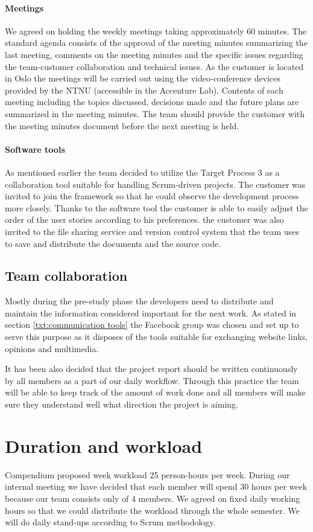 \paragraph{Meetings}
We agreed on holding the weekly meetings taking approximately 60 minutes. The standard agenda consists of the approval of the meeting minutes summarizing the last meeting, comments on the meeting minutes and the specific issues regarding the team-customer collaboration and technical issues. As the customer is located in Oslo the meetings will be carried out using the video-conference devices provided by the NTNU (accessible in the Accenture Lab). Contents of each meeting including the topics discussed, decisions made and the future plans are summarized in the meeting minutes. The team should provide the customer with the meeting minutes document before the next meeting is held.

\paragraph{Software tools}
As mentioned earlier the team decided to utilize the Target Process 3 as a collaboration tool suitable for handling Scrum-driven projects. The customer was invited to join the framework so that he could observe the development process more closely. Thanks to the software tool the customer is able to easily adjust the order of the user stories according to his preferences. the customer was also invited to the file sharing service and version control system that the team uses to save and distribute the documents and the source code.

\subsection{Team collaboration}
Mostly during the pre-study phase the developers need to distribute and maintain the information considered important for the next work. As stated in section \ref{txt:communication tools} the Facebook group was chosen and set up to serve this purpose as it disposes of the tools suitable for exchanging website links, opinions and multimedia.

It has been also decided that the project report should be written continuously by all members as a part of our daily workflow. Through this practice the team will be able to keep track of the amount of work done and all members will make sure they understand well what direction the project is aiming.

\section{Duration and workload}
Compendium proposed week workload 25 person-hours per week. 
During our internal meeting we have decided that each member will spend 30 hours per week because our team consists only of 4 members. 
We agreed on fixed daily working hours so that we could distribute the workload through the whole semester.
We will do daily stand-ups according to Scrum methodology.

